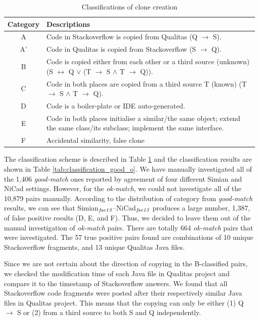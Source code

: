 \documentclass{IEEEtran}
\begin{document}
\begin{table}[H]
	\centering
	\caption{Classifications of clone creation}
	\label{tab:classification_scheme}
	\begin{tabular}{|c|p{13cm}|}
		\hline 
		Category & Descriptions \\ 
		\hline 
		A & Code in Stackoverflow is copied from Qualitas (Q $\rightarrow$ S). \\ 
		\hline 
		A' & Code in Qualitas is copied from Stackoverflow (S $\rightarrow$ Q). \\ 
		\hline 
		B & Code is copied either from each other or a third source (unknown) (S $\leftrightarrow$ Q $\vee$ (T $\rightarrow$ S $\wedge$ T $\rightarrow$ Q)).
		\\ 
		\hline 
		C & Code in both places are copied from a third source T (known) (T $\rightarrow$ S $\wedge$ T $\rightarrow$ Q).
		\\ 
		\hline 
		D & Code is a boiler-plate or IDE auto-generated.
		\\ 
		\hline 
		E & Code in both places initialise a similar/the same object; extend the same class/its subclass; implement the same interface.
		\\ 
		\hline 
		F & Accidental similarity, false clone \\ 
		\hline 
	\end{tabular} 
\end{table}

The classification scheme is described in Table \ref{tab:classification_scheme} and the classification results are shown in Table \ref{tab:classification_good_o}. We have manually investigated all of the 1,406 \textit{good-match} ones reported by agreement of four different Simian and NiCad settings.  However, for the \textit{ok-match}, we could not investigate all of the 10,879 pairs manually.  According to the distribution of category from \textit{good-match} results, we can see that Simian$_{\textrm{\textit{fse13}}}$--NiCad$_{\textrm{\textit{fse13}}}$ produces a large number, 1,387, of false positive results (D, E, and F). Thus, we decided to leave them out of the manual investigation of \textit{ok-match} pairs. There are totally 664 \textit{ok-match} pairs that were investigated. The 57 true positive pairs found are combinations of 10 unique Stackoverflow fragments, and 13 unique Qualitas Java files.

Since we are not certain about the direction of copying in the B-classified pairs, we checked the modification time of each Java file in Qualitas project and compare it to the timestamp of Stackoverflow answers. We found that all Stackoverflow code fragments were posted after their respectively similar Java files in Qualitas project. This means that the copying can only be either (1) Q $\rightarrow$ S or (2) from a third source to both S and Q independently.
\end{document}
